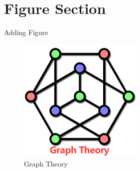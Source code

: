 \section{Figure Section}
\begin{frame}{Adding Figure}
 \begin{figure}[h]
    \centering
    \includegraphics[scale = 0.5]{graph.png}
    \caption{Graph Theory}
    \label{fig:1}
\end{figure}   
\end{frame}
